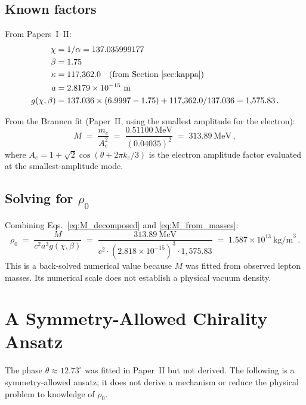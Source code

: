 \documentclass[11pt]{article}
\begin{document}
\subsection{Known factors}

From Papers~I--II:
\begin{align}
  \chi &= 1/\alpha = 137.035999177 \nonumber \\
  \beta &= 1.75 \nonumber \\
  \kappa &= 117{,}362.0 \quad \text{(from Section~\ref{sec:kappa})} \nonumber \\
  a &= 2.8179 \times 10^{-15}~\text{m} \nonumber \\
  g(\chi, \beta) &= 137.036 \times (6.9997 - 1.75) + 117{,}362.0/137.036
  = 1{,}575.83\,. \label{eq:g_numerical}
\end{align}

From the Brannen fit (Paper~II, using the smallest amplitude for the electron):
\begin{equation}
  M \;=\; \frac{m_e}{A_e^2}
  \;=\; \frac{0.51100~\text{MeV}}{(0.04035)^2}
  \;=\; 313.89~\text{MeV}\,,
  \label{eq:M_from_masses}
\end{equation}
where $A_e = 1 + \sqrt{2}\cos(\theta + 2\pi k_e/3)$ is the electron amplitude
factor evaluated at the smallest-amplitude mode.

\subsection{Solving for $\rho_0$}

Combining Eqs.~\eqref{eq:M_decomposed} and \eqref{eq:M_from_masses}:
\begin{equation}
  \rho_0
  \;=\; \frac{M}{c^2 a^3 g(\chi,\beta)}
  \;=\; \frac{313.89~\text{MeV}}{c^2 \cdot (2.818 \times 10^{-15})^3
        \cdot 1{,}575.83}
  \;=\; 1.587 \times 10^{13}~\text{kg/m}^3\,.
  \label{eq:rho0_numerical}
\end{equation}
This is a back-solved numerical value because $M$ was fitted from observed
lepton masses. Its numerical scale does not establish a physical vacuum density.


\section{A Symmetry-Allowed Chirality Ansatz}
\label{sec:theta}

The phase $\theta \approx 12.73^\circ$ was fitted in Paper~II but not derived.
The following is a symmetry-allowed ansatz; it does not derive a mechanism or
reduce the physical problem to knowledge of $\rho_0$.
\end{document}
